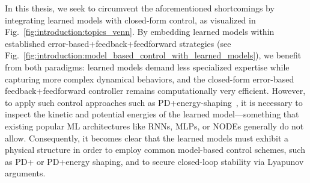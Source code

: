 In this thesis, we seek to circumvent the aforementioned shortcomings by integrating learned models with closed-form control, as visualized in Fig.~\ref{fig:introduction:topics_venn}. By embedding learned models within established error-based+feedback+feedforward strategies (see Fig.~\ref{fig:introduction:model_based_control_with_learned_models}), we benefit from both paradigms: learned models demand less specialized expertise while capturing more complex dynamical behaviors, and the closed-form error-based feedback+feedforward controller remains computationally very efficient. However, to apply such control approaches such as PD+energy-shaping~\citep{della2023model, caasenbrood2023control}, it is necessary to inspect the kinetic and potential energies of the learned model—something that existing popular \gls{ML} architectures like \glspl{RNN}, \glspl{MLP}, or \glspl{NODE} generally do not allow. Consequently, it becomes clear that the learned models must exhibit a physical structure in order to employ common model-based control schemes, such as PD+ or PD+energy shaping, and to secure closed-loop stability via Lyapunov arguments.

